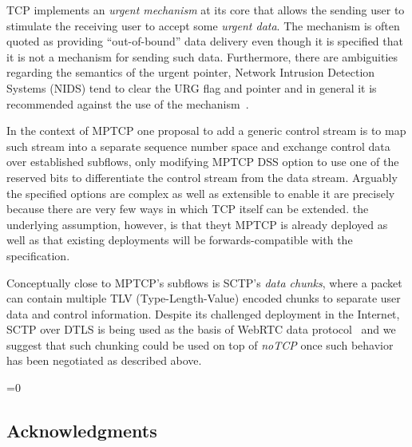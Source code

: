 \documentclass{sig-alternate-10pt}
\def\anon{1}        %
\begin{document}
TCP implements an \emph{urgent mechanism} at its core that allows the sending user to stimulate the receiving user to accept some \emph{urgent data}. The mechanism is often quoted as providing ``out-of-bound'' data delivery even though it is specified that it is not a mechanism for sending such data. Furthermore, there are ambiguities regarding the semantics of the urgent pointer, Network Intrusion Detection Systems (NIDS) tend to clear the URG flag and pointer and in general it is recommended against the use of the mechanism~\cite{Gont:2011vi}.

In the context of MPTCP one proposal to add a generic control stream is to map such stream into a separate sequence number space and exchange control data over established subflows, only modifying MPTCP DSS option to use one of the reserved bits to differentiate the control stream from the data stream. Arguably the specified options are complex as well as extensible to enable it are precisely because there are very few ways in which TCP itself can be extended. the underlying assumption, however, is that theyt MPTCP is already deployed as well as that existing deployments will be forwards-compatible with the specification.

Conceptually close to MPTCP's subflows is SCTP's \emph{data chunks}, where a packet can contain multiple TLV (Type-Length-Value) encoded chunks to separate user data and control information. Despite its challenged deployment in the Internet, SCTP over DTLS is being used as the basis of WebRTC data protocol~\cite{Tuexen:wv} and we suggest that such chunking could be used on top of \emph{noTCP} once such behavior has been negotiated as described above.


%

\ifnum\anon=0
\subsection*{Acknowledgments}

\fi



{\footnotesize 


}

%
\end{document}
